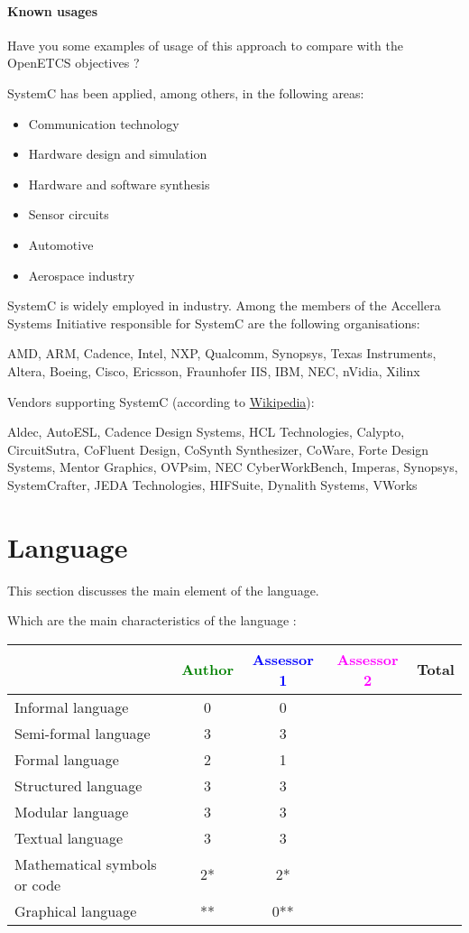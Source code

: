 \paragraph{Known usages} Have you some examples of usage of this approach to compare with the OpenETCS objectives ?

SystemC has been applied, among others, in the following areas:

\begin{itemize}
\item Communication technology
\item Hardware design and simulation
\item Hardware and software synthesis
\item Sensor circuits
\item Automotive
\item Aerospace industry
\end{itemize}

SystemC is widely employed in industry. Among the members of the Accellera Systems Initiative responsible for SystemC are the following organisations:

AMD, ARM, Cadence, Intel, NXP, Qualcomm, Synopsys, Texas Instruments, Altera, Boeing, Cisco, Ericsson, Fraunhofer IIS, IBM, NEC, nVidia, Xilinx

Vendors supporting SystemC (according to \href{http://en.wikipedia.org/wiki/SystemC}{Wikipedia}):

Aldec, AutoESL, Cadence Design Systems, HCL Technologies, Calypto, CircuitSutra, CoFluent Design, CoSynth Synthesizer, CoWare, Forte Design Systems, Mentor Graphics, OVPsim, NEC CyberWorkBench, Imperas, Synopsys, SystemCrafter, JEDA Technologies, HIFSuite, Dynalith Systems, VWorks


\section{Language}
This section discusses the main element of the language.

Which are the main characteristics of the language :

\begin{tabular}{|l | c | c | c | c|}
\hline
& \textcolor{green}{Author} & \textcolor{blue}{Assessor 1} & \textcolor{magenta}{Assessor 2} & Total \\
\hline
Informal language &0 & 0 & & \\
\hline
Semi-formal language &3 & 3& & \\
\hline
Formal language &2 &1 & & \\
\hline
Structured language &3 &3 & & \\
\hline
Modular language &3 &3 & & \\
\hline
Textual language &3 &3 & & \\
\hline
Mathematical symbols or code &2* &2* & & \\
\hline
Graphical language &** & 0**& & \\
\hline
\end{tabular}

